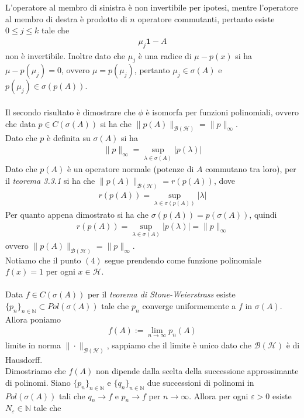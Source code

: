 \documentclass{article}
\numberwithin{equation}{subsection}
\begin{document}
L'operatore al membro di sinistra è non invertibile per ipotesi, mentre l'operatore al membro di destra è prodotto di $n$ operatore commutanti, pertanto esiste $0 \leq j \leq k$ tale che 
\begin{align*}
    \mu_j\mathbf{1} - A 
\end{align*}
non è invertibile. Inoltre dato che $\mu_j$ è una radice di $\mu - p(x)$ si ha $\mu - p(\mu_j) = 0$, ovvero $\mu = p(\mu_j)$, pertanto $\mu_j \in \sigma(A)$ e $p(\mu_j) \in \sigma(p(A))$. \\ \\
Il secondo risultato è dimostrare che $\phi$ è isomorfa per funzioni polinomiali, ovvero che data $p \in C(\sigma(A))$ si ha che $\|p(A)\|_{\mathcal{B}(\mathcal{H})} = \|p\|_\infty$. \\
Dato che $p$ è definita su $\sigma(A)$ si ha
\begin{align*}
    \|p\|_\infty = \sup_{\lambda \in \sigma(A)}|p(\lambda)| 
\end{align*}
Dato che $p(A)$ è un operatore normale (potenze di $A$ commutano tra loro), per il \textit{teorema 3.3.1} si ha che $\|p(A)\|_{\mathcal{B}(\mathcal{H})} = r(p(A))$, dove
\begin{align*}
    r(p(A)) = \sup_{\lambda \in \sigma(p(A))} |\lambda| 
\end{align*}
Per quanto appena dimostrato si ha che $\sigma(p(A)) = p(\sigma(A))$, quindi 
\begin{align*}
    r(p(A)) = \sup_{\lambda \in \sigma(A)} |p(\lambda)| = \|p\|_\infty 
\end{align*}
ovvero $\|p(A)\|_{\mathcal{B}(\mathcal{H})} = \|p\|_{\infty}$. \\
Notiamo che il punto $(4)$ segue prendendo come funzione polinomiale $f(x) = 1$ per ogni $x \in \mathcal{H}$. \\ \\
Data $f \in C(\sigma(A))$ per il \textit{teorema di Stone-Weierstrass} esiste $\{p_n\}_{n \in \mathbb{N}} \subset Pol(\sigma(A))$ tale che $p_n$ converge uniformemente a $f$ in $\sigma(A)$. Allora poniamo 
\begin{align*}
    f(A) := \lim_{n \rightarrow \infty}p_n(A) 
\end{align*}
limite in norma $\|\cdot\|_{\mathcal{B}(\mathcal{H})}$, sappiamo che il limite è unico dato che $\mathcal{B}(\mathcal{H})$ è di Hausdorff. \\
Dimostriamo che $f(A)$ non dipende dalla scelta della successione approssimante di polinomi. Siano $\{p_n\}_{n \in \mathbb{N}}$ e $\{q_n\}_{n \in \mathbb{N}}$ due successioni di polinomi in $Pol(\sigma(A))$ tali che $q_n \rightarrow f$ e $p_n \rightarrow f$ per $n \rightarrow \infty$. Allora per ogni $\varepsilon > 0$ esiste $N_\varepsilon \in \mathbb{N}$ tale che 
\end{document}
